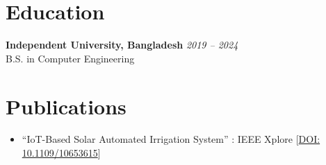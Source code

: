 \documentclass[10pt,letterpaper]{article}
\begin{document}
\section*{Education}
\noindent\textbf{Independent University, Bangladesh} \hfill \textit{2019 -- 2024}\\
B.S. in Computer Engineering

\section*{Publications}
\begin{itemize}
  \item ``IoT-Based Solar Automated Irrigation System'' : IEEE Xplore [\href{https://doi.org/10.1109/10653615}{DOI: 10.1109/10653615}]
\end{itemize}
\end{document}
